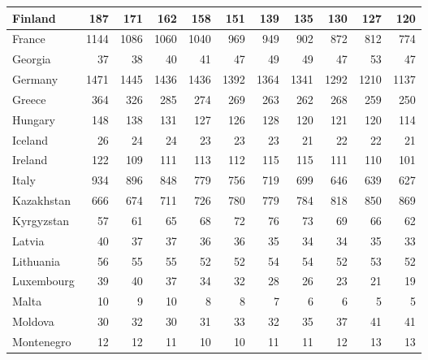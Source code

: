\begin{table}
\begin{tabular}{|l|r|r|r|r|r|r|r|r|r|r|}
                       Finland&    187&    171&    162&    158&    151&    139&    135&    130&    127&    120\\\hline
                        France&   1144&   1086&   1060&   1040&    969&    949&    902&    872&    812&    774\\\hline
                       Georgia&     37&     38&     40&     41&     47&     49&     49&     47&     53&     47\\\hline
                       Germany&   1471&   1445&   1436&   1436&   1392&   1364&   1341&   1292&   1210&   1137\\\hline
                        Greece&    364&    326&    285&    274&    269&    263&    262&    268&    259&    250\\\hline
                       Hungary&    148&    138&    131&    127&    126&    128&    120&    121&    120&    114\\\hline
                       Iceland&     26&     24&     24&     23&     23&     23&     21&     22&     22&     21\\\hline
                       Ireland&    122&    109&    111&    113&    112&    115&    115&    111&    110&    101\\\hline
                         Italy&    934&    896&    848&    779&    756&    719&    699&    646&    639&    627\\\hline
                    Kazakhstan&    666&    674&    711&    726&    780&    779&    784&    818&    850&    869\\\hline
                    Kyrgyzstan&     57&     61&     65&     68&     72&     76&     73&     69&     66&     62\\\hline
                        Latvia&     40&     37&     37&     36&     36&     35&     34&     34&     35&     33\\\hline
                     Lithuania&     56&     55&     55&     52&     52&     54&     54&     52&     53&     52\\\hline
                    Luxembourg&     39&     40&     37&     34&     32&     28&     26&     23&     21&     19\\\hline
                         Malta&     10&      9&     10&      8&      8&      7&      6&      6&      5&      5\\\hline
                       Moldova&     30&     32&     30&     31&     33&     32&     35&     37&     41&     41\\\hline
                    Montenegro&     12&     12&     11&     10&     10&     11&     11&     12&     13&     13\\\hline

\end{tabular}
\end{table}
